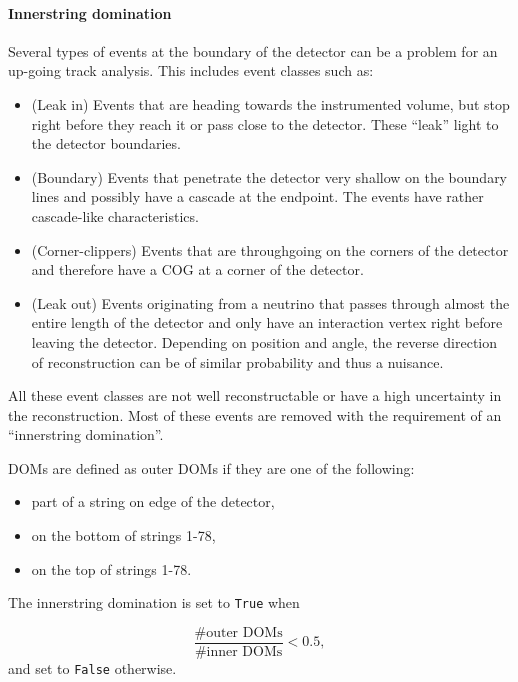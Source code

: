 \paragraph{Innerstring domination}
Several types of events at the boundary of the detector can be a problem for an up-going track analysis. This includes event classes such as:

\vspace{2mm}
\begin{itemize}
\item (Leak in) Events that are heading towards the instrumented volume, but stop right before they reach it or pass close to the detector. These ``leak'' light to the detector boundaries.
\item (Boundary) Events that penetrate the detector very shallow on the boundary lines and possibly have a cascade at the endpoint. The events have rather cascade-like characteristics.
\item (Corner-clippers) Events that are throughgoing on the corners of the detector and therefore have a COG at a corner of the detector.
\item (Leak out) Events originating from a neutrino that passes through almost the entire length of the detector and only have an interaction vertex right before leaving the detector. Depending on position and angle, the reverse direction of reconstruction can be of similar probability and thus a nuisance.
\end{itemize}
\vspace{2mm}

\noindent All these event classes are not well reconstructable or have a high uncertainty in the reconstruction. Most of these events are removed with the requirement of an ``innerstring domination''.

DOMs are defined as outer DOMs if they are one of the following:

\vspace{2mm}
\begin{itemize}
\item part of a string on edge of the detector,
\item on the bottom of strings 1-78,
\item on the top of strings 1-78.
\end{itemize}
\vspace{2mm}

\noindent The innerstring domination is set to \texttt{True} when 

\begin{equation}
\frac{\# \textrm{outer DOMs}}{\#\textrm{inner DOMs}} < 0.5,
\end{equation}
\noindent and set to \texttt{False} otherwise.

